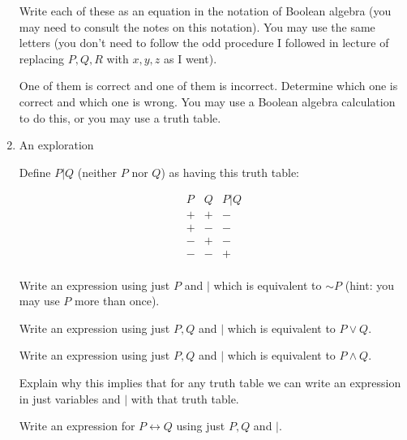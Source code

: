 \documentclass[12pt]{article}
\begin{document}
\begin{enumerate}
Write each of these as an equation in the notation of Boolean algebra (you may need to consult the notes on this notation).  You may use the same letters (you don't need to follow the odd procedure I followed in lecture of replacing $P,Q,R$ with $x,y,z$ as I went).

One of them is correct and one of them is incorrect.  Determine which one is correct and which one is wrong.  You may use a Boolean algebra calculation to do this, or you may
use a truth table.

\item An exploration

Define $P | Q$ (neither $P$ nor $Q$) as having this truth table:

$$\begin{array}{c|c||c}

P & Q & P|Q \\

+ & + & - \\

+ & - & - \\

- & + & - \\
- & - & + \\

\end{array}$$

Write an expression using just $P$ and $|$ which is equivalent to $\sim P$ (hint:  you may use $P$ more than once).

Write an expression using just $P, Q$ and $|$ which is equivalent to $P \vee Q$.

Write an expression using just $P, Q$ and $|$ which is equivalent to $P \wedge Q$.

Explain why this implies that for any truth table we can write an expression in just variables and $|$ with that truth table.

Write an expression for $P \leftrightarrow Q$ using just $P,Q$ and $|$.

\end{enumerate}
\end{document}
